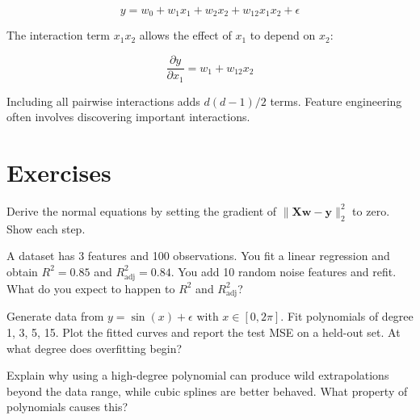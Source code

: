 \[
	y = w_0 + w_1 x_1 + w_2 x_2 + w_{12} x_1 x_2 + \epsilon
\]

The interaction term $x_1 x_2$ allows the effect of $x_1$ to depend on $x_2$:

\[
	\frac{\partial y}{\partial x_1} = w_1 + w_{12} x_2
\]

Including all pairwise interactions adds $d(d-1)/2$ terms. Feature engineering often involves discovering important interactions.

\section{Exercises}

\begin{exercise}
	Derive the normal equations by setting the gradient of $\|\mathbf{X}\mathbf{w} - \mathbf{y}\|_2^2$ to zero. Show each step.
\end{exercise}

\begin{exercise}
	A dataset has 3 features and 100 observations. You fit a linear regression and obtain $R^2 = 0.85$ and $R^2_{\text{adj}} = 0.84$. You add 10 random noise features and refit. What do you expect to happen to $R^2$ and $R^2_{\text{adj}}$?
\end{exercise}

\begin{exercise}
	Generate data from $y = \sin(x) + \epsilon$ with $x \in [0, 2\pi]$. Fit polynomials of degree 1, 3, 5, 15. Plot the fitted curves and report the test MSE on a held-out set. At what degree does overfitting begin?
\end{exercise}

\begin{exercise}
	Explain why using a high-degree polynomial can produce wild extrapolations beyond the data range, while cubic splines are better behaved. What property of polynomials causes this?
\end{exercise}
